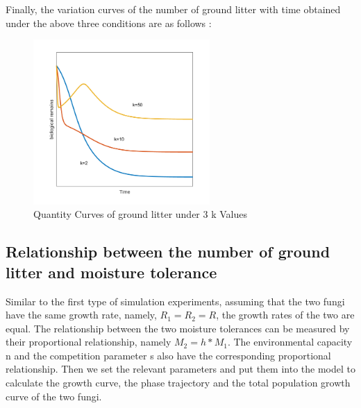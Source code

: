 \documentclass{mcmthesis}
\begin{document}
Finally, the variation curves of the number of ground litter with time obtained under the above three conditions are as follows :
\begin{figure}[H]
	\centering
	\includegraphics[width=0.6\textwidth]{img/不同k的分解曲线.png}
	\caption{Quantity Curves of ground litter under 3 k Values}\label{fig:不同k的分解曲线}
\end{figure}
\subsection{Relationship between the number of ground litter and moisture tolerance}
Similar to the first type of simulation experiments, assuming that the two fungi have the same growth rate, namely, $ R _ 1 = R _ 2 = R $, the growth rates of the two are equal. The relationship between the two moisture tolerances can be measured by their proportional relationship, namely $ M _ 2 = h * M _ 1 $. The environmental capacity n and the competition parameter s also have the corresponding proportional relationship. Then we set the relevant parameters and put them into the model to calculate the growth curve, the phase trajectory and the total population growth curve of the two fungi.       
\end{document}
